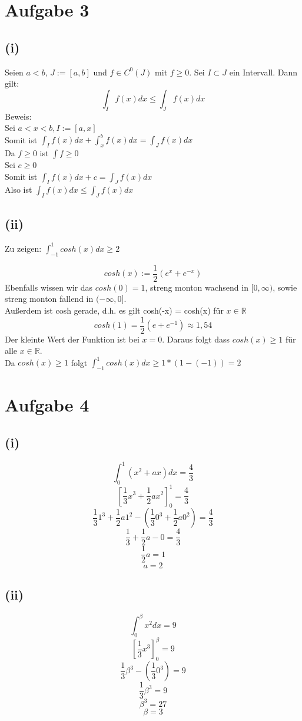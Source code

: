 \documentclass{article}
\begin{document}
\section*{Aufgabe 3}
\subsection*{(i)}
Seien $a<b$, $J:=[a,b]$ und $f \in C^0(J)$ mit $f \geq 0$. Sei $I \subset J$ ein Intervall. Dann gilt:
\[\int_I f(x) dx \leq \int_J f(x)dx\]
Beweis: \\
Sei $a<x<b, I:= [a,x]$ \\
Somit ist \(\int_If(x)dx + \int_x^b f(x)dx = \int_J f(x)dx \) \\
Da \(f\geq 0 \) ist \( \int f \geq 0\) \\
Sei $c \geq 0$ \\
Somit ist \(\int_I{f(x) dx} + c = \int_Jf(x)dx\) \\
Also ist \(\int_I f(x) dx \leq \int_J f(x)dx\)

\subsection*{(ii)}
Zu zeigen: \(\int_{-1}^{1} cosh(x) dx \geq 2\)

\[cosh(x):= \frac{1}{2}(e^x+e^{-x})\]
Ebenfalls wissen wir das $cosh(0)=1$, streng monton wachsend in $[0,\infty)$, sowie streng monton fallend in $(-\infty,0]$. \\
Außerdem ist cosh gerade, d.h. es gilt cosh(-x) = cosh(x) für $x\in \mathbb{R}$
\[cosh(1) = \frac{1}{2}(e+e^{-1}) \approx 1,54\]
Der kleinte Wert der Funktion ist bei $x=0$. Daraus folgt dass $cosh(x)\geq1$ für alle $x \in \mathbb{R}$. \\
Da $cosh(x) \geq 1$ folgt $\int_{-1}^1 cosh(x) dx \geq 1*(1-(-1)) =2$

\section*{Aufgabe 4}
\subsection*{(i)}
\[\int_0^1{(x^2+ax) dx} = \frac{4}{3}\]
\[[\frac{1}{3}x^3+\frac{1}{2}ax^2]_0^1 = \frac{4}{3}\]
\[\frac{1}{3}1^3+\frac{1}{2}a1^2 - (\frac{1}{3}0^3+\frac{1}{2}a0^2) = \frac{4}{3}\]
\[\frac{1}{3}+\frac{1}{2}a - 0 = \frac{4}{3}\]
\[\frac{1}{2}a  = 1 \] 
\[a=2\]

\subsection*{(ii)}
\[\int_0^\beta{x^2 dx}=9\]
\[[\frac{1}{3}x^3]_0^\beta = 9\]
\[\frac{1}{3}\beta^3-(\frac{1}{3}0^3)=9\]
\[\frac{1}{3}\beta^3=9\]
\[\beta^3=27\]
\[\beta=3\]
\end{document}
